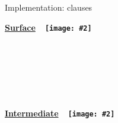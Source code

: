 \documentclass[aspectratio=169]{beamer}
\newcommand\img[2]{\texttt{[image: \#2]}}
\newcommand\smallImg[1]{\img{1.7em}{#1}}
\newcommand\midrule{\hspace{\midruleL}\vrule\hspace{\midruleR}}
\begin{document}
\begin{frame}[fragile]{Implementation:  clauses}

\begin{minipage}{.33\textwidth}%
\textbf{\underline{Surface}~~\smallImg{agda}}

\begin{code}[hide]%
\>[0]\AgdaSpace{}%
\AgdaSpace{}%
\<%
\end{code}
\begin{code}%
\>[0][@{}l@{\AgdaIndent{1}}]%
\>[2]\AgdaSpace{}%
\AgdaSymbol{:}\AgdaSpace{}%
\AgdaSpace{}%
\AgdaSpace{}%
\<%
\\
%
\>[2]%
\>[2578I]\AgdaSpace{}%
\AgdaSymbol{=}\AgdaSpace{}%
\<%
\\
\>[.][@{}l@{}]\<[2578I]%
\>[4]\<%
\\
\>[4][@{}l@{\AgdaIndent{0}}]%
\>[6]\AgdaSpace{}%
\AgdaSymbol{:}\AgdaSpace{}%
\<%
\\
%
\>[6]\AgdaSpace{}%
\AgdaSymbol{=}\AgdaSpace{}%
\<%
\\
%
\>[6]\<%
\end{code}
\end{minipage}
\midrule
\begin{minipage}{.33\textwidth}%
\textbf{\underline{Intermediate}~~\vspace{1pt}\smallImg{agda}}


\end{minipage}
\end{frame}
\end{document}

